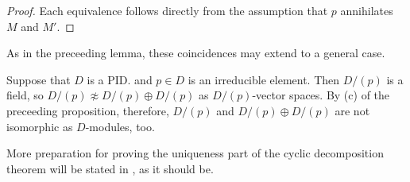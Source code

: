 \begin{proof}
    Each equivalence follows directly from the assumption that $p$ annihilates $M$ and $M'$.
\end{proof}
\begin{rmk}
    As in the preceeding lemma, these coincidences may extend to a general case.
\end{rmk}
\begin{exmp}
    Suppose that $D$ is a PID. and $p\in D$ is an irreducible element.
    Then $D/(p)$ is a field, so $D/(p)\not\approx D/(p)\oplus D/(p)$ as $D/(p)$-vector spaces.
    By (c) of the preceeding proposition, therefore, $D/(p)$ and $D/(p)\oplus D/(p)$ are not isomorphic as $D$-modules, too.
\end{exmp}
More preparation for proving the uniqueness part of the cyclic decomposition theorem will be stated in , as it should be.
